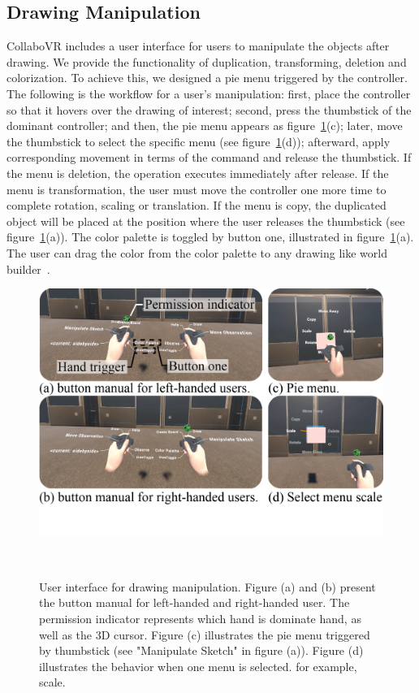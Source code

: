\documentclass{sigchi}
\begin{document}
\subsection{Drawing Manipulation}
CollaboVR includes a user interface for users to manipulate the objects after drawing. We provide the functionality of duplication, transforming, deletion and colorization. To achieve this, we designed a pie menu triggered by the controller. The following is the workflow for a user's manipulation: first, place the controller so that it hovers over the drawing of interest; second, press the thumbstick of the dominant controller; and then, the pie menu appears as figure~\ref{fig:userinterface}(c); later, move the thumbstick to select the specific menu (see figure~\ref{fig:userinterface}(d)); afterward, apply corresponding movement in terms of the command and release the thumbstick. If the menu is deletion, the operation executes immediately after release. If the menu is transformation, the user must move the controller one more time to complete rotation, scaling or translation. If the menu is copy, the duplicated object will be placed at the position where the user releases the thumbstick (see figure~\ref{fig:userinterface}(a)). The color palette is toggled by button one, illustrated in figure~\ref{fig:userinterface}(a). The user can drag the color from the color palette to any drawing like world builder~\cite{worldbuilder}.

\begin{figure}[b!]
 \centering
 \includegraphics[width=0.95\columnwidth]{Figure6.png}
 \caption{User interface for drawing manipulation. Figure (a) and (b) present the button manual for left-handed and right-handed user. The permission indicator represents which hand is dominate hand, as well as the 3D cursor. Figure (c) illustrates the pie menu triggered by thumbstick (see "Manipulate Sketch" in figure (a)). Figure (d) illustrates the behavior when one menu is selected. for example, scale.
 }~\label{fig:userinterface}
\end{figure}
\end{document}
